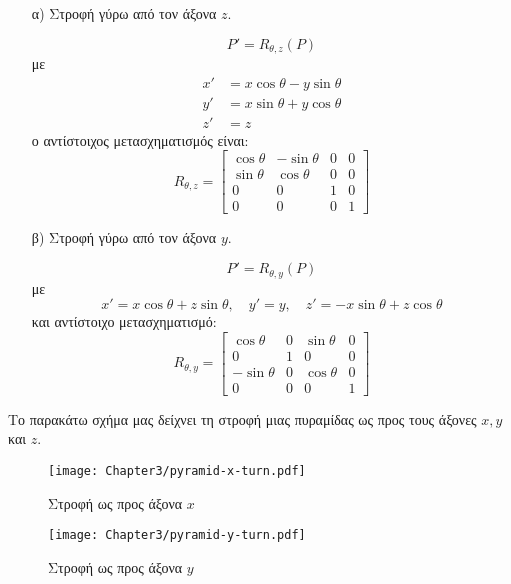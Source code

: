 \begin{enumerate}
    \item[α)] Στροφή γύρω από τον άξονα $z$.

    \[
    P' = R_{\theta,z}(P)
    \]
    με
    \begin{align*}
	    x' &= x \cos \theta - y \sin \theta \\
	    y' &= x \sin \theta + y \cos \theta \\ 
	    z' &= z
    \end{align*}
    ο αντίστοιχος μετασχηματισμός είναι:
    \[
    R_{\theta,z} = 
    \begin{bmatrix}
    \cos{\theta} & -\sin{\theta} & 0 & 0 \\
    \sin{\theta} & \cos{\theta} & 0 & 0 \\
    0 & 0 & 1 & 0 \\
    0 & 0 & 0 & 1
    \end{bmatrix}
    \]

    \item[β)]Στροφή γύρω από τον άξονα $y$.

    \[
    P' = R_{\theta,y}(P)
    \]
    με
    \[
    x' = x \cos{\theta} + z \sin{\theta}, \quad y' = y, \quad z' = -x \sin{\theta} + z \cos{\theta}
    \]
    και αντίστοιχο μετασχηματισμό:
    \[
    R_{\theta,y} = 
    \begin{bmatrix}
    \cos \theta & 0 & \sin \theta & 0 \\
    0 & 1 & 0 & 0 \\
    -\sin \theta & 0 & \cos \theta & 0 \\
    0 & 0 & 0 & 1
    \end{bmatrix}
    \]
\end{enumerate}

Το παρακάτω σχήμα μας δείχνει τη στροφή μιας πυραμίδας ως προς τους άξονες $x,y$ και $z$.

\begin{figure}[hbt]
  \begin{center}
	\texttt{[image: Chapter3/pyramid-x-turn.pdf]}
  \end{center}
  \caption{Στροφή ως προς άξονα $x$}
\end{figure}


\begin{figure}[hbt]
  \begin{center}
	\texttt{[image: Chapter3/pyramid-y-turn.pdf]}
  \end{center}
  \caption{Στροφή ως προς άξονα $y$}
\end{figure}

